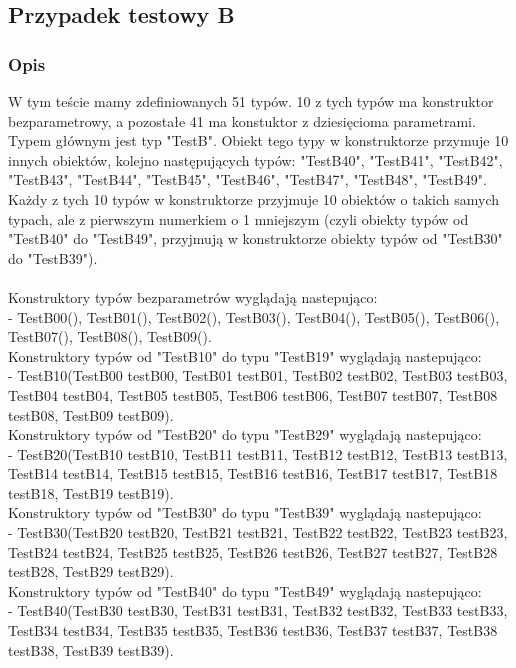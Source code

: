 \documentclass[12pt]{article}
\begin{document}
\subsection{Przypadek testowy B}
\subsubsection{Opis}
W tym teście mamy zdefiniowanych 51 typów. 10 z tych typów ma konstruktor bezparametrowy, a pozostałe 41 ma konstuktor z dziesięcioma parametrami. Typem głównym jest typ "TestB". Obiekt tego typy w konstruktorze przymuje 10 innych obiektów, kolejno następujących typów: "TestB40", "TestB41", "TestB42", "TestB43", "TestB44", "TestB45", "TestB46", "TestB47", "TestB48", "TestB49". Każdy z tych 10 typów w konstruktorze przyjmuje 10 obiektów o takich samych typach, ale z pierwszym numerkiem o 1 mniejszym (czyli obiekty typów od "TestB40" do "TestB49", przyjmują w konstruktorze obiekty typów od "TestB30" do "TestB39").\\
\\
Konstruktory typów bezparametrów wyglądają nastepująco:\\
- TestB00(), TestB01(),  TestB02(), TestB03(), TestB04(), TestB05(), TestB06(), TestB07(), TestB08(), TestB09().\\
Konstruktory typów od "TestB10" do typu "TestB19" wyglądają nastepująco:\\
- TestB10(TestB00 testB00, TestB01 testB01, TestB02 testB02, TestB03 testB03, TestB04 testB04, TestB05 testB05, TestB06 testB06, TestB07 testB07, TestB08 testB08, TestB09 testB09).\\
Konstruktory typów od "TestB20" do typu "TestB29" wyglądają nastepująco:\\
- TestB20(TestB10 testB10, TestB11 testB11, TestB12 testB12, TestB13 testB13, TestB14 testB14, TestB15 testB15, TestB16 testB16, TestB17 testB17, TestB18 testB18, TestB19 testB19).\\
Konstruktory typów od "TestB30" do typu "TestB39" wyglądają nastepująco:\\
- TestB30(TestB20 testB20, TestB21 testB21, TestB22 testB22, TestB23 testB23, TestB24 testB24, TestB25 testB25, TestB26 testB26, TestB27 testB27, TestB28 testB28, TestB29 testB29).\\
Konstruktory typów od "TestB40" do typu "TestB49" wyglądają nastepująco:\\
- TestB40(TestB30 testB30, TestB31 testB31, TestB32 testB32, TestB33 testB33, TestB34 testB34, TestB35 testB35, TestB36 testB36, TestB37 testB37, TestB38 testB38, TestB39 testB39).\\
\end{document}
